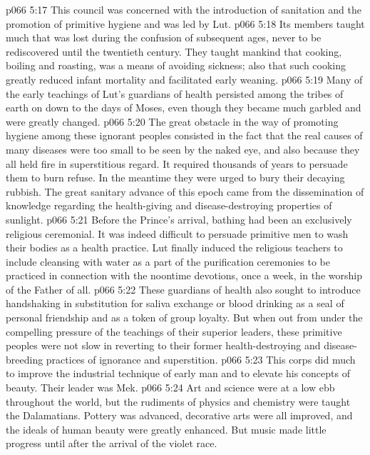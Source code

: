\pc \vs p066 5:17 \bibnobreakspace {} This council was concerned with the introduction of sanitation and the promotion of primitive hygiene and was led by Lut.
\vs p066 5:18 Its members taught much that was lost during the confusion of subsequent ages, never to be rediscovered until the twentieth century. They taught mankind that cooking, boiling and roasting, was a means of avoiding sickness; also that such cooking greatly reduced infant mortality and facilitated early weaning.
\vs p066 5:19 Many of the early teachings of Lut’s guardians of health persisted among the tribes of earth on down to the days of Moses, even though they became much garbled and were greatly changed.
\vs p066 5:20 The great obstacle in the way of promoting hygiene among these ignorant peoples consisted in the fact that the real causes of many diseases were too small to be seen by the naked eye, and also because they all held fire in superstitious regard. It required thousands of years to persuade them to burn refuse. In the meantime they were urged to bury their decaying rubbish. The great sanitary advance of this epoch came from the dissemination of knowledge regarding the health\hyp{}giving and disease\hyp{}destroying properties of sunlight.
\vs p066 5:21 Before the Prince’s arrival, bathing had been an exclusively religious ceremonial. It was indeed difficult to persuade primitive men to wash their bodies as a health practice. Lut finally induced the religious teachers to include cleansing with water as a part of the purification ceremonies to be practiced in connection with the noontime devotions, once a week, in the worship of the Father of all.
\vs p066 5:22 These guardians of health also sought to introduce handshaking in substitution for saliva exchange or blood drinking as a seal of personal friendship and as a token of group loyalty. But when out from under the compelling pressure of the teachings of their superior leaders, these primitive peoples were not slow in reverting to their former health\hyp{}destroying and disease\hyp{}breeding practices of ignorance and superstition.\plusone
\pc \vs p066 5:23 \bibnobreakspace {} This corps did much to improve the industrial technique of early man and to elevate his concepts of beauty. Their leader was Mek.
\vs p066 5:24 Art and science were at a low ebb throughout the world, but the rudiments of physics and chemistry were taught the Dalamatians. Pottery was advanced, decorative arts were all improved, and the ideals of human beauty were greatly enhanced. But music made little progress until after the arrival of the violet race.
